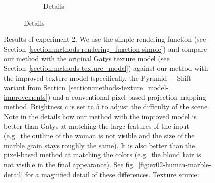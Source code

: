 \begin{figure}[]
\begin{subfigure}{\textwidth}
\begin{subfigure}{0.78\textwidth}
\begin{subfigure}{0.32\textwidth}
                \begin{subfigure}{\textwidth}
                    \centering
                \end{subfigure}
            \end{subfigure}
            \caption*{Details}
        \end{subfigure}
    \end{subfigure}
    \caption{Results of experiment 2. We use the simple rendering function (see Section~\ref{section:methods-rendering_function-simple}) and compare our method with the original Gatys texture model (see Section~\ref{section:methods-texture_model}) against our method with the improved texture model (specifically, the Pyramid + Shift variant from Section~\ref{section:methods-texture_model-improvements}) and a conventional pixel-based projection mapping method. Brightness \(c\) is set to \(5\) to adjust the difficulty of the scene. Note in the details how our method with the improved model is better than Gatys at matching the large features of the input (e.g.~the outline of the woman is not visible and the size of the marble grain stays roughly the same). It is also better than the pixel-based method at matching the colors (e.g.~the blond hair is not visible in the final appearance). See fig.~\ref{fig:ex02-human-marble-detail} for a magnified detail of these differences. Texture source: \citet{Pixar128}}
    \label{fig:ex02-human-marble}
\end{figure}

